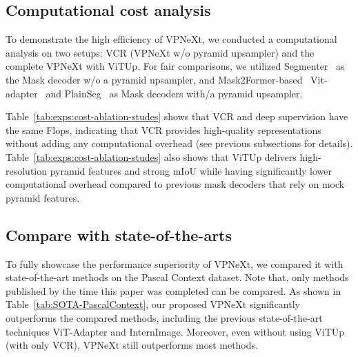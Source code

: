 \subsection{Computational cost analysis}
To demonstrate the high efficiency of VPNeXt, we conducted a computational analysis on two setups: VCR (VPNeXt w/o pyramid upsampler) and the complete VPNeXt with ViTUp.
%
For fair comparisons, we utilized Segmenter~\cite{cSegmenter} as the Mask decoder w/o a pyramid upsampler, and Mask2Former-based~\cite{cMask2Former} Vit-adapter~\cite{cViTAdapter} and PlainSeg~\cite{cPlainSeg} as Mask decoders with/a pyramid upsampler.

Table~\ref{tab:exps:cost-ablation-studes} shows that VCR and deep supervision have the same Flops, indicating that VCR provides high-quality representations without adding any computational overhead (see previous subsections for details).
%
Table~\ref{tab:exps:cost-ablation-studes} also shows that ViTUp delivers high-resolution pyramid features and strong mIoU while having significantly lower computational overhead compared to previous mask decoders that rely on mock pyramid features.




\subsection{Compare with state-of-the-arts}
To fully showcase the performance superiority of VPNeXt, we compared it with state-of-the-art methods on the Pascal Context dataset.
%
Note that, only methods published by the time this paper was completed can be compared.
%
As shown in Table~\ref{tab:SOTA-PascalContext}, our proposed VPNeXt significantly outperforms the compared methods, including the previous state-of-the-art techniques ViT-Adapter and InternImage. 
%
Moreover, even without using ViTUp (\ie with only VCR), VPNeXt still outperforms most methods.


